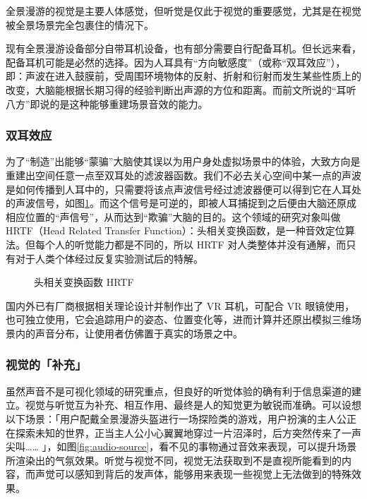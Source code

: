 全景漫游的视觉是主要人体感觉，但听觉是仅此于视觉的重要感觉，尤其是在视觉被全景场景完全包裹住的情况下。

现有全景漫游设备部分自带耳机设备，也有部分需要自行配备耳机。但长远来看，配备耳机可能是必然的选择。因为人耳具有“方向敏感度”（或称“双耳效应”），即：声波在进入鼓膜前，受周围环境物体的反射、折射和衍射而发生某些性质上的改变，大脑能根据长期习得的经验判断出声源的方位和距离。而前文所说的“耳听八方”即说的是这种能够重建场景音效的能力。

\subsubsection{双耳效应}
为了“制造”出能够“蒙骗”大脑使其误以为用户身处虚拟场景中的体验，大致方向是重建出空间任意一点至双耳处的滤波器函数。我们不必去关心空间中某一点的声波是如何传播到人耳中的，只需要将该点声波信号经过滤波器便可以得到它在人耳处的声波信号，如图\ref{fig:hrtf}。而这个信号是可逆的，即被人耳捕捉到之后便由大脑还原成相应位置的“声信号”，从而达到“欺骗”大脑的目的。这个领域的研究对象叫做 HRTF（Head Related Transfer Function）：头相关变换函数，是一种音效定位算法。但每个人的听觉能力都是不同的，所以 HRTF 对人类整体并没有通解，而只有对于人类个体经过反复实验测试后的特解。

\begin{figure}[htp]
\centering
{}
\caption{头相关变换函数 HRTF}
\label{fig:hrtf}
\end{figure}

国内外已有厂商根据相关理论设计并制作出了 VR 耳机，可配合 VR 眼镜使用，也可独立使用，它会追踪用户的姿态、位置变化等，进而计算并还原出模拟三维场景内的声音分布，让使用者仿佛置于真实的场景之中。

\subsubsection{视觉的「补充」}
虽然声音不是可视化领域的研究重点，但良好的听觉体验的确有利于信息渠道的建立。视觉与听觉互为补充、相互作用、最终是人的知觉更为敏锐而准确。可以设想以下场景：「用户配戴全景漫游头盔进行一场探险类的游戏，用户扮演的主人公正在探索未知的世界，正当主人公小心翼翼地穿过一片沼泽时，后方突然传来了一声尖叫…… 」，如图\ref{fig:audio-source}，看不见的事物通过音效来表现，可以提升场景所渲染出的气氛效果。听觉与视觉不同，视觉无法获取到不是直视所能看到的内容，而声觉可以感知到背后的发声体，能够用来表现一些视觉上无法做到的特殊效果。


